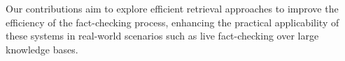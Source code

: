     
Our contributions aim to explore efficient retrieval approaches to improve the efficiency of the fact-checking process, enhancing the practical applicability of these systems in real-world scenarios such as live fact-checking over large knowledge bases.




